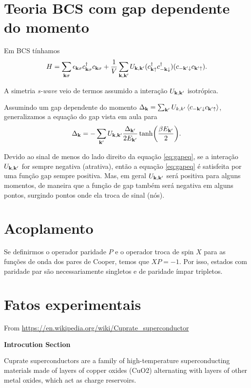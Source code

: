 \documentclass[a4paper,11pt]{article}
\begin{document}
\section{Teoria BCS com gap dependente do momento}

Em BCS tínhamos
$$
H = \sum_{\vb{k}\sigma} \epsilon_{\vb{k}\sigma} c_{\vb{k}\sigma}^\dagger c_{\vb{k}\sigma} +
\frac{1}{V} \sum_{\vb{k},\vb{k}'} U_{\vb{k},\vb{k}'} (c_{\vb{k}\uparrow}^\dagger c_{-\vb{k}\downarrow}^\dagger) (c_{-\vb{k}'\downarrow} c_{\vb{k}'\uparrow}).
$$

A simetria \textit{s-wave} veio de termos assumido a interação $U_{\vb{k},\vb{k}'}$ isotrópica.

Assumindo um gap dependente do momento $\Delta_{\k} = \sum_{\k'} U_{k, k'} \ev{c_{-\k'\down}c_{\k'\up}}$, generalizamos a equação do gap vista em aula para
\begin{equation} \label{eq:gapeq}
\Delta_{\vb{k}} = - \sum_{\vb{k}'} U_{\vb{k},\vb{k}'} \frac{\Delta_{\vb{k}'}}{2 E_{\vb{k}'}} \tanh(\frac{\beta E_{\vb{k}'}}{2}).
\end{equation}

Devido ao sinal de menos do lado direito da equação \ref{eq:gapeq}, se a interação $U_{\vb{k},\vb{k}'}$ for sempre negativa (atrativa), então a equação \ref{eq:gapeq} é satisfeita por uma função gap sempre positiva. Mas, em geral $U_{\vb{k},\vb{k}'}$ será positiva para alguns momentos, de maneira que a função de gap também será negativa em alguns pontos, surgindo pontos onde ela troca de sinal (nós).


\section{Acoplamento}

Se definirmos o operador paridade $P$ e o operador troca de spin $X$ para as funções de onda dos pares de Cooper, temos que $XP = -1$. Por isso, estados com paridade par são necessariamente singletos e de paridade ímpar tripletos.

\pagebreak


\section{Fatos experimentais}

From \url{https://en.wikipedia.org/wiki/Cuprate_superconductor}

\textbf{Introcution Section}

Cuprate superconductors are a family of high-temperature superconducting materials made of layers of copper oxides (CuO2) alternating with layers of other metal oxides, which act as charge reservoirs.
\end{document}
